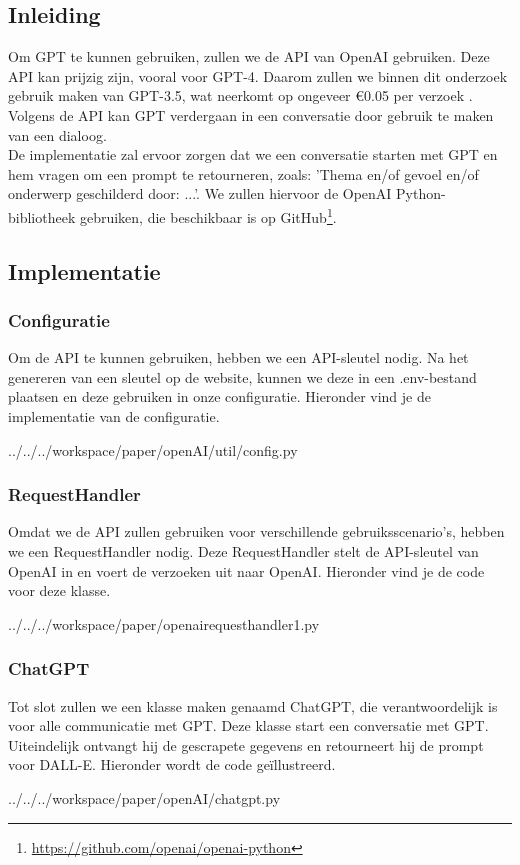 \subsection{Inleiding}
Om GPT te kunnen gebruiken, zullen we de API van OpenAI gebruiken. Deze API kan prijzig zijn, vooral voor GPT-4. Daarom zullen we binnen dit onderzoek gebruik maken van GPT-3.5, wat neerkomt op ongeveer €0.05 per verzoek \autocite{gpt_pricing}. \\

Volgens de API kan GPT verdergaan in een conversatie door gebruik te maken van een dialoog. \\

De implementatie zal ervoor zorgen dat we een conversatie starten met GPT en hem vragen om een prompt te retourneren, zoals: 'Thema en/of gevoel en/of onderwerp geschilderd door: ...'. We zullen hiervoor de OpenAI Python-bibliotheek gebruiken, die beschikbaar is op GitHub\footnote{\url{https://github.com/openai/openai-python}}.

\subsection{Implementatie}
\subsubsection{Configuratie}
Om de API te kunnen gebruiken, hebben we een API-sleutel nodig. Na het genereren van een sleutel op de website, kunnen we deze in een .env-bestand plaatsen en deze gebruiken in onze configuratie. Hieronder vind je de implementatie van de configuratie.
\begin{pythoncode}{../../../workspace/paper/openAI/util/config.py}
\end{pythoncode}

\subsubsection{RequestHandler}
Omdat we de API zullen gebruiken voor verschillende gebruiksscenario's, hebben we een RequestHandler nodig. Deze RequestHandler stelt de API-sleutel van OpenAI in en voert de verzoeken uit naar OpenAI. Hieronder vind je de code voor deze klasse.
\begin{pythoncode}{../../../workspace/paper/openairequesthandler1.py}
\end{pythoncode}

\subsubsection{ChatGPT}
Tot slot zullen we een klasse maken genaamd ChatGPT, die verantwoordelijk is voor alle communicatie met GPT. Deze klasse start een conversatie met GPT. Uiteindelijk ontvangt hij de gescrapete gegevens en retourneert hij de prompt voor DALL-E. Hieronder wordt de code geïllustreerd.
\begin{pythoncode}{../../../workspace/paper/openAI/chatgpt.py}
\end{pythoncode}


